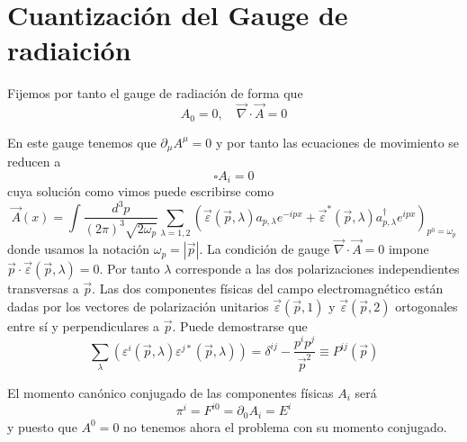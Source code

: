 \section{Cuantización del Gauge de radiaición}
Fijemos por tanto el gauge de radiación de forma que
\begin{equation*}
A_{0}=0, \quad \vec{\nabla} \cdot \vec{A}=0 \tag{6.25}
\end{equation*}

En este gauge tenemos que $\partial_{\mu} A^{\mu}=0$ y por tanto las ecuaciones de movimiento se reducen a
\begin{equation*}
\square A_{i}=0 \tag{6.26}
\end{equation*}
cuya solución como vimos puede escribirse como
\begin{equation*}
\vec{A}(x)=\int \frac{d^{3} p}{(2 \pi)^{3} \sqrt{2 \omega_{p}}} \sum_{\lambda=1,2}\left(\vec{\varepsilon}(\vec{p}, \lambda) a_{p, \lambda} e^{-i p x}+\vec{\varepsilon}^{*}(\vec{p}, \lambda) a_{p, \lambda}^{\dagger} e^{i p x}\right)_{p^{0}=\omega_{p}} \tag{6.27}
\end{equation*}
donde usamos la notación $\omega_{p}=|\vec{p}|$. La condición de gauge $\vec{\nabla} \cdot \vec{A}=0$ impone $\vec{p} \cdot \vec{\varepsilon}(\vec{p}, \lambda)=0$. Por tanto $\lambda$ corresponde a las dos polarizaciones independientes transversas a $\vec{p}$. Las dos componentes físicas del campo electromagnético están dadas por los vectores de polarización unitarios $\vec{\varepsilon}(\vec{p}, 1)$ y $\vec{\varepsilon}(\vec{p}, 2)$ ortogonales entre sí y perpendiculares a $\vec{p}$. Puede demostrarse que
\begin{equation*}
\sum_{\lambda}\left(\varepsilon^{i}(\vec{p}, \lambda) \varepsilon^{j *}(\vec{p}, \lambda)\right)=\delta^{i j}-\frac{p^{i} p^{j}}{\vec{p}^{2}} \equiv P^{i j}(\vec{p}) \tag{6.28}
\end{equation*}

El momento canónico conjugado de las componentes físicas $A_{i}$ será
\begin{equation*}
\pi^{i}=F^{i 0}=\partial_{0} A_{i}=E^{i} \tag{6.29}
\end{equation*}
y puesto que $A^{0}=0$ no tenemos ahora el problema con su momento conjugado.

